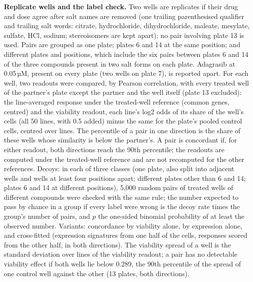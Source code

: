 \documentclass[pdflatex,sn-nature]{sn-jnl}
\begin{document}
\textbf{Replicate wells and the label check.} Two wells are replicates if their drug and dose agree after salt names are removed (one trailing parenthesised qualifier and trailing salt words: citrate, hydrochloride, dihydrochloride, maleate, mesylate, sulfate, HCl, sodium; stereoisomers are kept apart); no pair involving plate 13 is used. Pairs are grouped as one plate; plates 6 and 14 at the same position; and different plates and positions, which include the six pairs between plates 6 and 14 of the three compounds present in two salt forms on each plate. Adagrasib at 0.05\,µM, present on every plate (two wells on plate 7), is reported apart. For each well, two readouts were compared, by Pearson correlation, with every treated well of the partner's plate except the partner and the well itself (plate 13 excluded): the line-averaged response under the treated-well reference (common genes, centred) and the viability readout, each line's log2 odds of its share of the well's cells (all 50 lines, with 0.5 added) minus the same for the plate's pooled control cells, centred over lines. The percentile of a pair in one direction is the share of these wells whose similarity is below the partner's. A pair is concordant if, for either readout, both directions reach the 90th percentile; the readouts are computed under the treated-well reference and are not recomputed for the other references. Decoys: in each of three classes (one plate, also split into adjacent wells and wells at least four positions apart; different plates other than 6 and 14; plates 6 and 14 at different positions), 5,000 random pairs of treated wells of different compounds were checked with the same rule; the number expected to pass by chance in a group if every label were wrong is the decoy rate times the group's number of pairs, and $p$ the one-sided binomial probability of at least the observed number. Variants: concordance by viability alone, by expression alone, and cross-fitted (expression signatures from one half of the cells, responses scored from the other half, in both directions). The viability spread of a well is the standard deviation over lines of the viability readout; a pair has no detectable viability effect if both wells lie below 0.289, the 90th percentile of the spread of one control well against the other (13 plates, both directions).
\end{document}
